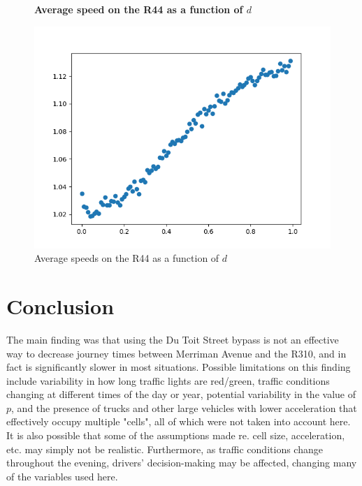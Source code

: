 \documentclass{article}
\begin{document}
\begin{figure}
\textbf{\large Average speed on the R44 as a function of $d$}\par\medskip
{}
\includegraphics[scale = 0.55, left]{./data/phase4/v_vs_d.png}
\vspace*{0.1cm}\hspace*{4.5cm}{\large $d$}
\caption{\label{fig} Average speeds on the R44 as a function of $d$}
\end{figure}

\section*{Conclusion}

The main finding was that using the Du Toit Street bypass is not an effective way to decrease journey times between Merriman Avenue and the R310, and in fact is significantly slower in most situations. Possible limitations on this finding include variability in how long traffic lights are red/green, traffic conditions changing at different times of the day or year, potential variability in the value of $p$, and the presence of trucks and other large vehicles with lower acceleration that effectively occupy multiple "cells", all of which were not taken into account here. It is also possible that some of the assumptions made re. cell size, acceleration, etc. may simply not be realistic. Furthermore, as traffic conditions change throughout the evening, drivers' decision-making may be affected, changing many of the variables used here.
\end{document}
